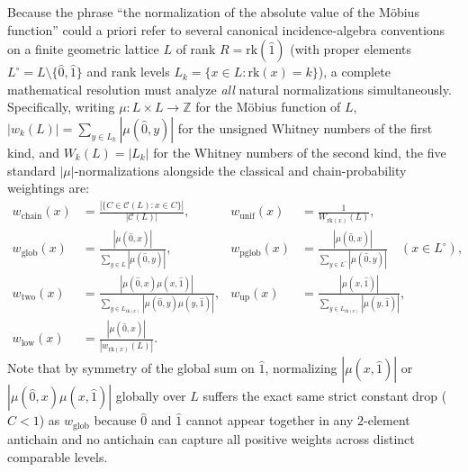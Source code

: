 \documentclass[11pt]{article}
\theoremstyle{definition}
\theoremstyle{remark}
\newcommand{\rk}{\mathrm{rk}}
\begin{document}
Because the phrase ``the normalization of the absolute value of the M\"obius function'' could a priori refer to several canonical incidence-algebra conventions on a finite geometric lattice $L$ of rank $R = \rk(\hat{1})$ (with proper elements $L^\circ = L \setminus \{\hat{0}, \hat{1}\}$ and rank levels $L_k = \{x \in L : \rk(x) = k\}$), a complete mathematical resolution must analyze \emph{all} natural normalizations simultaneously. Specifically, writing $\mu : L \times L \to \mathbb{Z}$ for the M\"obius function of $L$, $|w_k(L)| = \sum_{y \in L_k} |\mu(\hat{0}, y)|$ for the unsigned Whitney numbers of the first kind, and $W_k(L) = |L_k|$ for the Whitney numbers of the second kind, the five standard $|\mu|$-normalizations alongside the classical and chain-probability weightings are:
\begin{align}
  w_{\mathrm{chain}}(x) &= \frac{|\{C \in \mathcal{C}(L) : x \in C\}|}{|\mathcal{C}(L)|}, &
  w_{\mathrm{unif}}(x) &= \frac{1}{W_{\rk(x)}(L)}, \label{eq:w-chain-unif}\\[3pt]
  w_{\mathrm{glob}}(x) &= \frac{|\mu(\hat{0}, x)|}{\sum_{y \in L} |\mu(\hat{0}, y)|}, &
  w_{\mathrm{pglob}}(x) &= \frac{|\mu(\hat{0}, x)|}{\sum_{y \in L^\circ} |\mu(\hat{0}, y)|}\quad (x \in L^\circ), \label{eq:w-globals}\\[3pt]
  w_{\mathrm{two}}(x) &= \frac{|\mu(\hat{0}, x)\mu(x, \hat{1})|}{\sum_{y \in L_{\rk(x)}} |\mu(\hat{0}, y)\mu(y, \hat{1})|}, &
  w_{\mathrm{up}}(x) &= \frac{|\mu(x, \hat{1})|}{\sum_{y \in L_{\rk(x)}} |\mu(y, \hat{1})|}, \label{eq:w-two-up}\\[3pt]
  w_{\mathrm{low}}(x) &= \frac{|\mu(\hat{0}, x)|}{|w_{\rk(x)}(L)|}. && \label{eq:w-low}
\end{align}
Note that by symmetry of the global sum on $\hat{1}$, normalizing $|\mu(x,\hat{1})|$ or $|\mu(\hat{0},x)\mu(x,\hat{1})|$ globally over $L$ suffers the exact same strict constant drop ($C < 1$) as $w_{\mathrm{glob}}$ because $\hat{0}$ and $\hat{1}$ cannot appear together in any $2$-element antichain and no antichain can capture all positive weights across distinct comparable levels.
\end{document}
